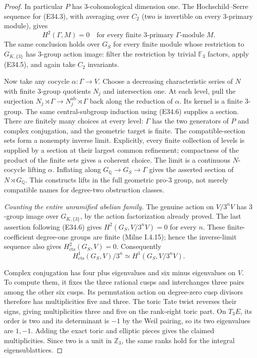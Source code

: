\begin{proof}
In particular $P$ has $3$-cohomological dimension one.
The Hochschild--Serre sequence for (E34.3), with averaging
over $C_2$ (two is invertible on every $3$-primary module),
gives
\[
 H^2(\Gamma,M)=0
 \quad\text{for every finite $3$-primary $\Gamma$-module }M.
 \tag{E34.6}
\]
The same conclusion holds over $G_S$ for every finite
module whose restriction to $G_{K,\{3\}}$ has $3$-group
action image: filter the restriction by trivial
$\mathbb F_3$ factors, apply (E34.5), and again take
$C_2$ invariants.

Now take any cocycle $\alpha:\Gamma\to V$.
Choose a decreasing characteristic series of $N$ with
finite $3$-group quotients $N_j$ and intersection one.
At each level, pull the surjection
$N_j\rtimes\Gamma\to N_j^{\mathrm{ab}}\rtimes\Gamma$
back along the reduction of $\alpha$.
Its kernel is a finite $3$-group. The same central-subgroup
induction using (E34.6) supplies a section.
There are finitely many choices at every level:
$\Gamma$ has the two generators of $P$ and complex
conjugation, and the geometric target is finite.
The compatible-section sets form a nonempty inverse limit.
Explicitly, every finite collection of levels is supplied
by a section at their largest common refinement; compactness
of the product of the finite sets gives a coherent choice.
The limit is a continuous $N$-cocycle lifting $\alpha$.
Inflating along $G_{\mathbb Q}\to G_S\to\Gamma$ gives
the asserted section of $N\rtimes G_{\mathbb Q}$.
This constructs lifts in the full geometric pro-$3$ group,
not merely compatible names for degree-two obstruction classes.

\emph{Counting the entire unramified abelian family.}
The genuine action on $V/3^nV$ has $3$-group image over
$G_{K,\{3\}}$, by the action factorization already proved.
The last assertion following (E34.6) gives
$H^2(G_S,V/3^nV)=0$ for every $n$.
These finite-coefficient degree-one groups are finite
(Milne I.4.15); hence the inverse-limit sequence also gives
$H^2_{\mathrm{cts}}(G_S,V)=0$.
Consequently
\[
 H^1_{\mathrm{cts}}(G_S,V)/3^n
       \simeq H^1(G_S,V/3^nV).
 \tag{E34.7}
\]

Complex conjugation has four plus eigenvalues and six minus
eigenvalues on $V$. To compute them, it fixes the three
rational cusps and interchanges three pairs among the other
six cusps. Its permutation action on degree-zero cusp
divisors therefore has multiplicities five and three.
The toric Tate twist reverses their signs, giving
multiplicities three and five on the rank-eight toric part.
On $T_3E$, its order is two and its determinant is $-1$ by
the Weil pairing, so its two eigenvalues are $1,-1$.
Adding the exact toric and elliptic pieces gives the claimed
multiplicities. Since two is a unit in $\mathbb Z_3$, the
same ranks hold for the integral eigensublattices.


\end{proof}
